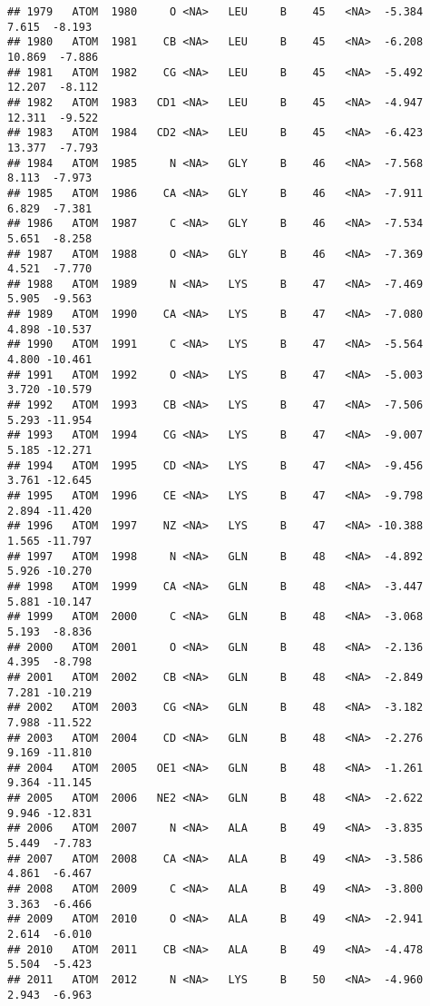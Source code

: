\documentclass[
]{article}
\begin{document}
\begin{verbatim}
## 1979   ATOM  1980     O <NA>   LEU     B    45   <NA>  -5.384   7.615  -8.193
## 1980   ATOM  1981    CB <NA>   LEU     B    45   <NA>  -6.208  10.869  -7.886
## 1981   ATOM  1982    CG <NA>   LEU     B    45   <NA>  -5.492  12.207  -8.112
## 1982   ATOM  1983   CD1 <NA>   LEU     B    45   <NA>  -4.947  12.311  -9.522
## 1983   ATOM  1984   CD2 <NA>   LEU     B    45   <NA>  -6.423  13.377  -7.793
## 1984   ATOM  1985     N <NA>   GLY     B    46   <NA>  -7.568   8.113  -7.973
## 1985   ATOM  1986    CA <NA>   GLY     B    46   <NA>  -7.911   6.829  -7.381
## 1986   ATOM  1987     C <NA>   GLY     B    46   <NA>  -7.534   5.651  -8.258
## 1987   ATOM  1988     O <NA>   GLY     B    46   <NA>  -7.369   4.521  -7.770
## 1988   ATOM  1989     N <NA>   LYS     B    47   <NA>  -7.469   5.905  -9.563
## 1989   ATOM  1990    CA <NA>   LYS     B    47   <NA>  -7.080   4.898 -10.537
## 1990   ATOM  1991     C <NA>   LYS     B    47   <NA>  -5.564   4.800 -10.461
## 1991   ATOM  1992     O <NA>   LYS     B    47   <NA>  -5.003   3.720 -10.579
## 1992   ATOM  1993    CB <NA>   LYS     B    47   <NA>  -7.506   5.293 -11.954
## 1993   ATOM  1994    CG <NA>   LYS     B    47   <NA>  -9.007   5.185 -12.271
## 1994   ATOM  1995    CD <NA>   LYS     B    47   <NA>  -9.456   3.761 -12.645
## 1995   ATOM  1996    CE <NA>   LYS     B    47   <NA>  -9.798   2.894 -11.420
## 1996   ATOM  1997    NZ <NA>   LYS     B    47   <NA> -10.388   1.565 -11.797
## 1997   ATOM  1998     N <NA>   GLN     B    48   <NA>  -4.892   5.926 -10.270
## 1998   ATOM  1999    CA <NA>   GLN     B    48   <NA>  -3.447   5.881 -10.147
## 1999   ATOM  2000     C <NA>   GLN     B    48   <NA>  -3.068   5.193  -8.836
## 2000   ATOM  2001     O <NA>   GLN     B    48   <NA>  -2.136   4.395  -8.798
## 2001   ATOM  2002    CB <NA>   GLN     B    48   <NA>  -2.849   7.281 -10.219
## 2002   ATOM  2003    CG <NA>   GLN     B    48   <NA>  -3.182   7.988 -11.522
## 2003   ATOM  2004    CD <NA>   GLN     B    48   <NA>  -2.276   9.169 -11.810
## 2004   ATOM  2005   OE1 <NA>   GLN     B    48   <NA>  -1.261   9.364 -11.145
## 2005   ATOM  2006   NE2 <NA>   GLN     B    48   <NA>  -2.622   9.946 -12.831
## 2006   ATOM  2007     N <NA>   ALA     B    49   <NA>  -3.835   5.449  -7.783
## 2007   ATOM  2008    CA <NA>   ALA     B    49   <NA>  -3.586   4.861  -6.467
## 2008   ATOM  2009     C <NA>   ALA     B    49   <NA>  -3.800   3.363  -6.466
## 2009   ATOM  2010     O <NA>   ALA     B    49   <NA>  -2.941   2.614  -6.010
## 2010   ATOM  2011    CB <NA>   ALA     B    49   <NA>  -4.478   5.504  -5.423
## 2011   ATOM  2012     N <NA>   LYS     B    50   <NA>  -4.960   2.943  -6.963

\end{verbatim}
\end{document}
